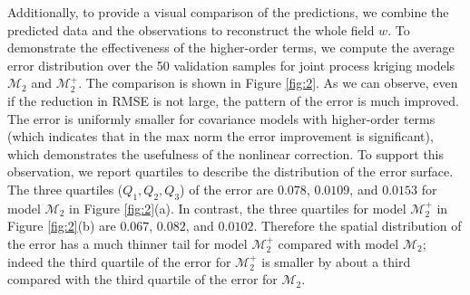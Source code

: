 \documentclass[article,ij4uq]{ij4uq}              %
\newcommand{\cm}[1]{{\color{red}Mihai:{#1}}}
\newcommand{\YC}[1]{\textcolor{blue}{[Yian:#1]}}
\begin{document}
\par Additionally, to provide a visual comparison of the predictions, we combine the predicted data and the observations to reconstruct the whole field $w$. To demonstrate the effectiveness of the higher-order terms, we compute the average error distribution over the 50 validation samples for joint process kriging models $\mathcal{M}_{2}$ and $\mathcal{M}_{2}^{+}$. The comparison is shown in Figure \ref{fig:2}. As we can observe, even if the reduction in RMSE is not large, the pattern of the error is much improved. The error is uniformly smaller for covariance models with higher-order terms (which indicates that in the max norm the error improvement is significant), which demonstrates the usefulness of the nonlinear correction. To support this observation, we report quartiles to describe the distribution of the error surface. The three quartiles ($Q_{1},Q_{2},Q_{3}$) of the error are $0.078$, $0.0109$, and $0.0153$ for model $\mathcal{M}_{2}$ in Figure \ref{fig:2}(a). In contrast, the three quartiles for model $\mathcal{M}_{2}^{+}$ in Figure \ref{fig:2}(b) are $0.067$, $0.082$, and $0.0102$. Therefore the spatial distribution of the error has a much thinner tail for model $\mathcal{M}_{2}^{+}$ compared with model $\mathcal{M}_{2}$; indeed  the third quartile of the error for $\mathcal{M}_{2}^{+}$ is smaller by about a third compared with the third quartile of the error for $\mathcal{M}_{2}$.
\end{document}
